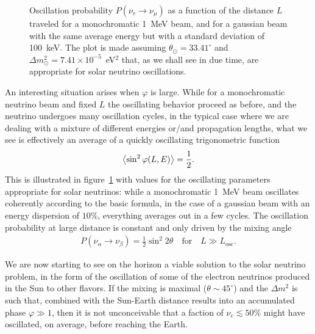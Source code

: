 \begin{figure}[!htbp]
  
  \caption{Oscillation probability $P(\nu_e \rightarrow \nu_\mu)$ as a function of
  the distance $L$ traveled for a monochromatic 1~MeV beam, and for a gaussian beam
  with the same average energy but with a standard deviation of 100~keV.
  The plot is made assuming $\theta_\odot = 33.41^\circ$ and
  $\Delta m^2_\odot = 7.41 \times 10^{-5}$~eV$^2$ that, as we shall see in due
  time, are appropriate for solar neutrino oscillations.}
  \label{fig:sun_neutrino_oscillation}
\end{figure}

An interesting situation arises when $\varphi$ is large. While for a monochromatic
neutrino beam and fixed $L$ the oscillating behavior proceed as before, and the
neutrino undergoes many oscillation cycles, in the typical case where we are dealing
with a mixture of different energies or/and propagation lengths, what we see is
effectively an average of a quickly oscillating trigonometric function
\begin{align*}
  \left<\sin^2\varphi(L, E)\right> = \frac{1}{2}.
\end{align*}
This is illustrated in figure~\ref{fig:sun_neutrino_oscillation} with values for the
oscillating parameters appropriate for solar neutrinos: while a monochromatic 1~MeV
beam oscillates coherently according to the basic formula, in the case of a gaussian
beam with an energy dispersion of $10\%$, everything averages out in a few cycles.
The oscillation probability at large distance is constant and only driven by the
mixing angle
\begin{align*}
  P(\nu_\alpha \rightarrow \nu_\beta) = \frac{1}{2} \sin^2 2\theta
  \quad\text{for}\quad L \gg L_\text{osc}.
\end{align*}

We are now starting to see on the horizon a viable solution to the solar neutrino
problem, in the form of the oscillation of some of the electron neutrinos produced
in the Sun to other flavors. If the mixing is maximal ($\theta \sim 45^\circ$) and
the $\Delta m^2$ is such that, combined with the Sun-Earth distance results into an
accumulated phase $\varphi \gg 1$, then it is not unconceivable that a faction of
$\nu_e \lesssim 50\%$ might have oscillated, on average, before reaching the
Earth.

